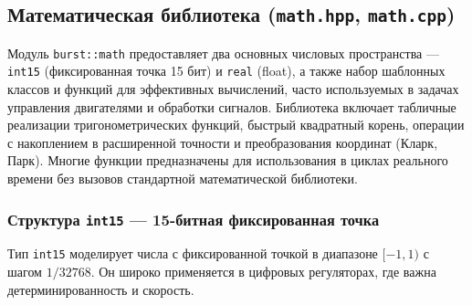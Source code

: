 \documentclass[a4paper,12pt]{article}
\begin{document}
\subsection{Математическая библиотека (\texttt{math.hpp}, \texttt{math.cpp})}

Модуль \texttt{burst::math} предоставляет два основных числовых пространства — \texttt{int15} (фиксированная точка 15 бит) и \texttt{real} (float), а также набор шаблонных классов и функций для эффективных вычислений, часто используемых в задачах управления двигателями и обработки сигналов. Библиотека включает табличные реализации тригонометрических функций, быстрый квадратный корень, операции с накоплением в расширенной точности и преобразования координат (Кларк, Парк). Многие функции предназначены для использования в циклах реального времени без вызовов стандартной математической библиотеки.

\subsubsection{Структура \texttt{int15} — 15-битная фиксированная точка}

Тип \texttt{int15} моделирует числа с фиксированной точкой в диапазоне $[-1, 1)$ с шагом $1/32768$. Он широко применяется в цифровых регуляторах, где важна детерминированность и скорость.
\end{document}
